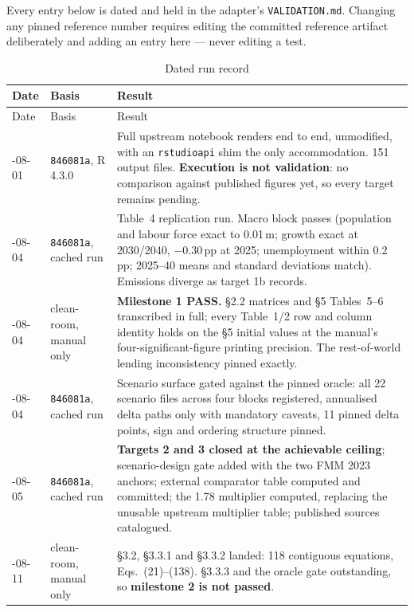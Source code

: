 Every entry below is dated and held in the adapter's \texttt{VALIDATION.md}. Changing any pinned reference number requires editing the committed reference artifact deliberately and adding an entry here --- never editing a test.

\footnotesize
\begin{longtable}{@{}l>{\raggedright\arraybackslash}p{}>{\raggedright\arraybackslash}p{}@{}}
\caption{Dated run record} \label{tab:runrecord} \\
\toprule
Date & Basis & Result \\
\midrule
\endfirsthead
\toprule
Date & Basis & Result \\
\midrule
\endhead
\bottomrule
\endfoot
2026-08-01 & \texttt{846081a}, R 4.3.0 & Full upstream notebook renders end to end, unmodified, with an \texttt{rstudioapi} shim the only accommodation. 151 output files. \textbf{Execution is not validation}: no comparison against published figures yet, so every target remains pending. \\
\addlinespace
2026-08-04 & \texttt{846081a}, cached run & Table~4 replication run. Macro block passes (population and labour force exact to 0.01\,m; growth exact at 2030/2040, $-0.30$\,pp at 2025; unemployment within 0.2\,pp; 2025--40 means and standard deviations match). Emissions diverge as target 1b records. \\
\addlinespace
2026-08-04 & clean-room, manual only & \textbf{Milestone 1 PASS.} \S2.2 matrices and \S5 Tables~5--6 transcribed in full; every Table~1/2 row and column identity holds on the \S5 initial values at the manual's four-significant-figure printing precision. The rest-of-world lending inconsistency pinned exactly. \\
\addlinespace
2026-08-04 & \texttt{846081a}, cached run & Scenario surface gated against the pinned oracle: all 22 scenario files across four blocks registered, annualised delta paths only with mandatory caveats, 11 pinned delta points, sign and ordering structure pinned. \\
\addlinespace
2026-08-05 & \texttt{846081a}, cached run & \textbf{Targets 2 and 3 closed at the achievable ceiling}; scenario-design gate added with the two FMM 2023 anchors; external comparator table computed and committed; the 1.78 multiplier computed, replacing the unusable upstream multiplier table; published sources catalogued. \\
\addlinespace
2026-08-11 & clean-room, manual only & \S3.2, \S3.3.1 and \S3.3.2 landed: 118 contiguous equations, Eqs.~(21)--(138). \S3.3.3 and the oracle gate outstanding, so \textbf{milestone 2 is not passed}. \\

\end{longtable}

